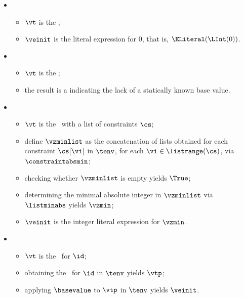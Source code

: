 \begin{itemize}
    \item {} 
    \begin{itemize}
        \item $\vt$ is the \unconstrainedintegertypeterm;
        \item $\veinit$ is the literal expression for $0$, that is, $\ELiteral(\LInt(0))$.
    \end{itemize}

    \item {} 
    \begin{itemize}
        \item $\vt$ is the \parameterizedintegertypeterm;
        \item the result is a \typingerrorterm{} indicating the lack of a statically known base value.
    \end{itemize}

    \item {} 
    \begin{itemize}
        \item $\vt$ is the \wellconstrainedintegertypeterm\ with a list of constraints $\cs$;
        \item define $\vzminlist$ as the concatenation of lists obtained for each
              constraint $\cs[\vi]$ in $\tenv$, for each $\vi\in\listrange(\cs)$, via $\constraintabsmin$;
        \item checking whether $\vzminlist$ is empty yields $\True$\ProseOrTypeError{\NoBaseValue};
        \item determining the minimal absolute integer in $\vzminlist$ via $\listminabs$ yields $\vzmin$;
        \item $\veinit$ is the integer literal expression for $\vzmin$.
    \end{itemize}

    \item {}
    \begin{itemize}
        \item $\vt$ is the \namedtype\ for $\id$;
        \item obtaining the \underlyingtypeterm\ for $\id$ in $\tenv$ yields $\vtp$\ProseOrTypeError;
        \item applying $\basevalue$ to $\vtp$ in $\tenv$ yields $\veinit$\ProseOrTypeError.
    \end{itemize}


\end{itemize}
